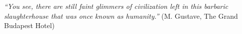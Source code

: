 
\begin{epigrafe}

\textit{``You see, there are still faint glimmers of civilization left in this barbaric slaughterhouse that was once known as humanity.''}
(M. Gustave, The Grand Budapest Hotel)

\end{epigrafe}

